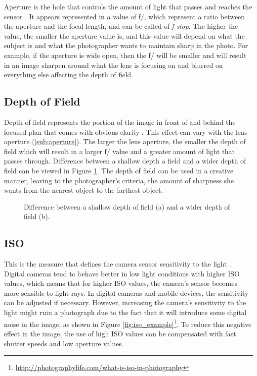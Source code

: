 Aperture is the hole that controls the amount of light that passes and reaches the sensor \cite{kamps2012rules, Santos}. It appears represented in a value of f/, which represent a ratio between the aperture and the focal length, and can be called of \emph{f-stop}. The higher the value, the smaller the aperture value is, and this value will depend on what the subject is and what the photographer wants to maintain sharp in the photo. For example, if the aperture is wide open, then the f/ will be smaller and will result in an image sharpen around what the lens is focusing on and blurred on everything else affecting the depth of field.

\subsection{Depth of Field}
\label{sub:depth_field}

Depth of field represents the portion of the image in front of and behind the focused plan that comes with obvious clarity \cite{kamps2012rules, Santos}. This effect can vary with the lens aperture (\ref{sub:aperture}). The larger the lens aperture, the smaller the depth of field which will result in a larger f/ value and a greater amount of light that passes through. Difference between a shallow depth a field and a wider depth of field can be viewed in Figure \ref{fig:depth_field_example}.
The depth of field can be used in a creative manner, leaving to the  photographer's criteria, the amount of sharpness she wants from the nearest object to the farthest object.

\begin{figure}[htbp]
        \centering
  \caption{Difference between a shallow depth of field (a) and a wider depth of field (b). \cite{kamps2012rules}}
  \label{fig:depth_field_example}
\end{figure}

\subsection{ISO}
\label{sub:iso}

This is the measure that defines the camera sensor sensitivity to the light \cite{kamps2012rules}. Digital cameras tend to behave better in low light conditions with higher ISO values, which means that for higher ISO values, the camera's sensor becomes more sensible to light rays.
In digital cameras and mobile devices, the sensitivity can be adjusted if necessary. However, increasing the camera's sensitivity to the light might ruin a photograph due to the fact that it will introduce some digital noise in the image, as shown in Figure \ref{fig:iso_example}\footnote{\url{http://photographylife.com/what-is-iso-in-photography}}. To reduce this negative effect in the image, the use of high ISO values can be compensated with fast shutter speeds and low aperture values.

